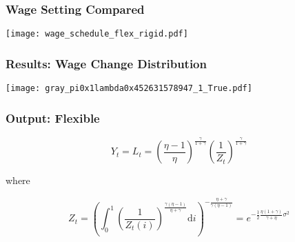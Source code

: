 \documentclass{beamer}
\begin{document}
\begin{frame}[t]\frametitle{Wage Setting Compared}

    \begin{center}
      \noindent \texttt{[image: wage\_schedule\_flex\_rigid.pdf]}
      \label{fig:wage_schedules}
    \end{center}

\end{frame}

\begin{frame}[t]\frametitle{Results: Wage Change Distribution}

    \begin{center}
      \texttt{[image: gray\_pi0x1lambda0x452631578947\_1\_True.pdf]}
      \label{fig:dist_1_periods}
    \end{center}


\end{frame}


\begin{frame}[t]\frametitle{Output: Flexible}

    \begin{equation*}
        \label{eq:output_flexible}
        Y_t = L_t = \left( \frac{\eta - 1}{\eta} \right)^{\frac{\gamma}{1 + \gamma}} \left( \frac{1}{Z_t} \right)^{\frac{\gamma}{1 + \gamma}}
    \end{equation*}

    where

    \begin{equation*}
        Z_t = \left( \int_{0}^{1}\! \left( \frac{1}{Z_t(i)} \right)^{\frac{\gamma(\eta - 1)}{\eta + \gamma}} \mathup{d}i \right)^{-\frac{\eta + \gamma}{\gamma(\eta - 1)}} \!\!\! = e^{-\frac{1}{2} \frac{\eta(1 + \gamma)}{\gamma + \eta}\sigma^2 }
    \end{equation*}


\end{frame}
\end{document}
